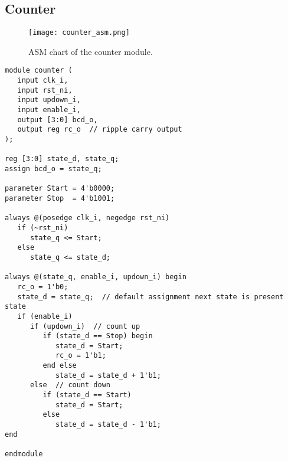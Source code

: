 \subsection{Counter}

\begin{figure}[htbp]
   \centering
   \texttt{[image: counter\_asm.png]}
   \caption{ASM chart of the counter module.}
   \label{fig:counter_asm}
\end{figure}

\begin{verbatim}
module counter (
   input clk_i,
   input rst_ni,
   input updown_i,
   input enable_i,
   output [3:0] bcd_o,
   output reg rc_o  // ripple carry output
);

reg [3:0] state_d, state_q;
assign bcd_o = state_q;

parameter Start = 4'b0000;
parameter Stop  = 4'b1001;

always @(posedge clk_i, negedge rst_ni)
   if (~rst_ni)
      state_q <= Start;
   else
      state_q <= state_d;

always @(state_q, enable_i, updown_i) begin
   rc_o = 1'b0;
   state_d = state_q;  // default assignment next state is present state
   if (enable_i)
      if (updown_i)  // count up
         if (state_d == Stop) begin
            state_d = Start;
            rc_o = 1'b1;
         end else
            state_d = state_d + 1'b1;
      else  // count down
         if (state_d == Start)
            state_d = Start;
         else
            state_d = state_d - 1'b1;
end

endmodule
\end{verbatim}


